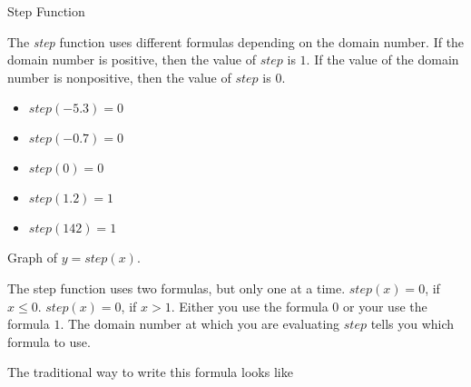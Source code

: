 \documentclass{ximera}
\begin{document}
\begin{example} Step Function


The \textit{step} function uses different formulas depending on the domain number.  If the domain number is positive, then the value of $step$ is $1$. If the value of the domain number is nonpositive, then the value of $step$ is $0$.



\begin{itemize}
\item $step(-5.3) = 0$
\item $step(-0.7) = 0$
\item $step(0) = 0$
\item $step(1.2) = 1$
\item $step(142) = 1$
\end{itemize}



Graph of $y = step(x)$.
\begin{image}
\end{image}


\end{example}





The step function uses two formulas, but only one at a time.  $step(x) = 0$, if $x \leq 0$. $step(x) = 0$, if $x > 1$.  Either you use the formula $0$ or your use the formula $1$.  The domain number at which you are evaluating $step$ tells you which formula to use.


The traditional way to write this formula looks like
\end{document}
